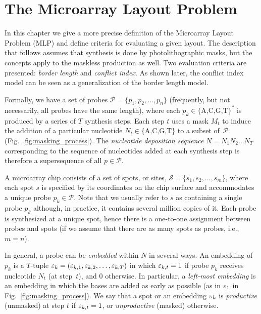 \chapter{The Microarray Layout Problem}
\label{ch:mlp}

In this chapter we give a more precise definition of the Microarray Layout
Problem (MLP) and define criteria for evaluating a given layout. The description
that follows assumes that synthesis is done by photolithographic masks, but the
concepts apply to the maskless production as well. Two evaluation criteria are
presented: \emph{border length} and \emph{conflict index}. As shown
later, the conflict index model can be seen as a generalization of the border
length model.

Formally, we have a set of probes $\mathcal{P} = \{p_{1}, p_{2},
\dots, p_{n}\}$ (frequently, but not necessarily, all probes have the
same length), where each $p_k \in \{\text{A,C,G,T}\}^\ast$ is
produced by a series of $T$ synthesis steps. Each step $t$ uses a mask
$M_t$ to induce the addition of a particular nucleotide $N_t \in
\{\text{A,C,G,T}\}$ to a subset of~$\mathcal{P}$
(Fig.~\ref{fig:masking_process}).  The \emph{nucleotide deposition
  sequence} $N = N_{1} N_{2} \ldots N_{T}$ corresponding to the
sequence of nucleotides added at each synthesis step is therefore a
supersequence of all $p \in \mathcal{P}$.

A microarray chip consists of a set of spots, or sites, $\mathcal{S} =
\{s_{1}, s_{2}, \dots, s_{m}\}$, where each spot $s$ is specified by its
coordinates on the chip surface and accommodates a unique probe
$p_k \in \mathcal{P}$. Note that we usually refer to $s$ as
containing a single probe $p_k$ although, in practice, it
contains several million copies of it. Each probe is synthesized at a
unique spot, hence there is a one-to-one assignment between probes and
spots (if we assume that there are as many spots as probes, i.e.,
$m=n$).

In general, a probe can be \emph{embedded} within $N$ in several ways.
An embedding of $p_{k}$ is a $T$-tuple $\varepsilon_{k} = (\varepsilon_{k,1},
\varepsilon_{k,2}, \dots, \varepsilon_{k,T})$ in which $\varepsilon_{k,t} = 1$ if probe
$p_{k}$ receives nucleotide $N_{t}$ (at step~$t$), and 0 otherwise.  In
particular, a \emph{left-most embedding} is an embedding in which the
bases are added as early as possible (as in $\varepsilon_1$ in
Fig.~\ref{fig:masking_process}).  We say that a spot or an embedding
$\varepsilon_k$ is \emph{productive} (unmasked) at step $t$ if $\varepsilon_{k,t} =
1$, or \emph{unproductive} (masked) otherwise.


